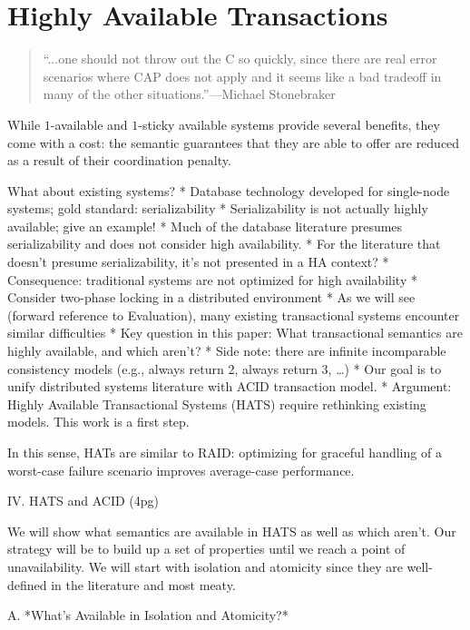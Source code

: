 
\section{Highly Available Transactions}
\label{sec:hats}

\begin{quote}
``...one should not throw out the C so quickly, since there are real
  error scenarios where CAP does not apply and it seems like a bad
  tradeoff in many of the other situations.''---Michael
  Stonebraker~\cite{stonebraker2010errors}
\end{quote}

While $1$-available and $1$-sticky available systems provide several
benefits, they come with a cost: the semantic guarantees that they are
able to offer are reduced as a result of their coordination penalty.

What about existing systems?
* Database technology developed for single-node systems; gold standard: serializability
	* Serializability is not actually highly available; give an example!
	* Much of the database literature presumes serializability and does not consider high availability.
	* For the literature that doesn't presume serializability, it's not presented in a HA context?
* Consequence: traditional systems are not optimized for high availability
	* Consider two-phase locking in a distributed environment
	* As we will see (forward reference to Evaluation), many existing transactional systems encounter similar difficulties
* Key question in this paper: What transactional semantics are highly available, and which aren't?
	* Side note: there are infinite incomparable consistency models (e.g., always return 2, always return 3, …)
	* Our goal is to unify distributed systems literature with ACID transaction model.
* Argument: Highly Available Transactional Systems (HATS) require rethinking existing models. This work is a first step.

In this sense, HATs are similar to RAID: optimizing for graceful
handling of a worst-case failure scenario improves average-case
performance.

IV. HATS and ACID (4pg)

We will show what semantics are available in HATS as well as which aren't. Our strategy will be to build up a set of properties until we reach a point of unavailability. We will start with isolation and atomicity since they are well-defined in the literature and most meaty.

A. *What's Available in Isolation and Atomicity?*

